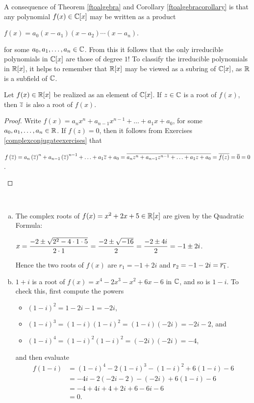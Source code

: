 \documentclass[11pt,fleqn,dvipsnames,usenames]{article}
\begin{document}
A consequence of Theorem \ref{ftoalgebra} and Corollary \ref{ftoalgebracorollary} is that any polynomial $f(x)\in\mathbb{C}[x]$ may be written as a product
\begin{center}
$f(x) = a_{0}(x - a_{1})(x - a_{2})\cdots (x - a_{n})$.
\end{center}
for some $a_{0},a_{1},\ldots, a_{n}\in\mathbb{C}$.  From this it follows that the only irreducible polynomials in $\mathbb{C}[x]$ are those of degree $1$!  To classify the irreducible polynomials in $\mathbb{R}[x]$, it helps to remember that $\mathbb{R}[x]$ may be viewed as a subring of $\mathbb{C}[x]$, as $\mathbb{R}$ is a subfield of $\mathbb{C}$.
%
\begin{lemma}\label{conjugatesalsoroots}
Let $f(x)\in\mathbb{R}[x]$ be realized as an element of $\mathbb{C}[x]$.  If $z\in \mathbb{C}$ is a root of $f(x)$, then $\overline{z}$ is also a root of $f(x)$.
\end{lemma}
%
\begin{proof}
Write $f(x) = a_{n}x^{n} + a_{n-1}x^{n-1} + \ldots + a_{1}x + a_{0}$, for some $a_{0},a_{1},\ldots, a_{n}\in\mathbb{R}$.  If $f(z) = 0$, then it follows from Exercises \ref{complexconjugateexercises} that
\begin{center}
$f\left(\overline{z}\right) = a_{n}\left(\overline{z}\right)^{n} + a_{n-1}\left(\overline{z}\right)^{n-1} + \ldots + a_{1}\overline{z} + a_{0} = \overline{a_{n}z^{n} + a_{n-1}z^{n-1} + \ldots + a_{1}z + a_{0}} = \overline{f(z)} = \overline{0} = 0$.
\end{center}
\end{proof}
%
\begin{examples}~
\begin{enumerate}[(a)]
\item The complex roots of $f(x) = x^2 + 2x + 5\in\mathbb{R}[x]$ are given by the Quadratic Formula:
\begin{center}
$\displaystyle{x = \frac{-2 \pm \sqrt{2^2 - 4\cdot 1\cdot 5}}{2\cdot 1} = \frac{-2 \pm \sqrt{-16}}{2} = \frac{-2 \pm 4i}{2} = -1 \pm 2i}$.
\end{center}
Hence the two roots of $f(x)$ are $r_{1} = -1 + 2i$ and $r_{2} = -1 - 2i = \overline{r_{1}}$.
\item $1 + i$ is a root of $f(x) = x^4 - 2x^3 - x^2 + 6x - 6$ in $\mathbb{C}$, and so is $1 - i$.  To check this, first compute the powers
\begin{itemize}[\ ]
\item $(1 - i)^2 = 1 - 2i - 1 = -2i$,
\item $(1 - i)^3 = (1-i)(1-i)^2 = (1- i)(-2i) = -2i - 2$, and
\item $(1 - i)^4 = (1-i)^2(1-i)^2 = (-2i)(-2i) = -4$,
\end{itemize}
and then evaluate
\begin{align*}
f(1-i) &= (1-i)^4 - 2(1-i)^3 - (1-i)^2 + 6(1-i) - 6\\
&= -4i - 2(-2i - 2) - (-2i) + 6(1-i) - 6\\
&= -4 +4i + 4 + 2i + 6 - 6i - 6\\
&= 0.
\end{align*}
\end{enumerate}
\end{examples}
\end{document}

